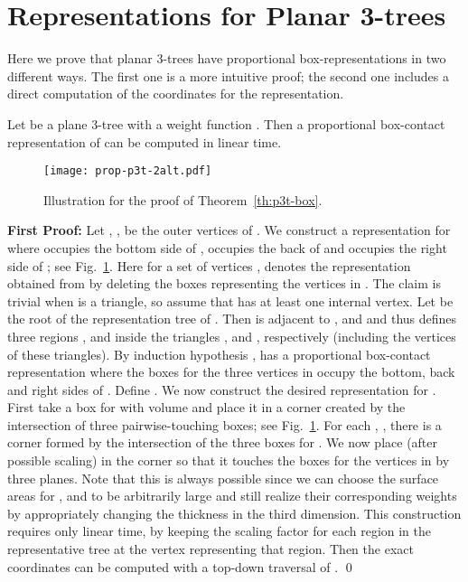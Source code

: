 \documentclass{llncs}
\begin{document}
 








\section{Representations for Planar 3-trees}


Here we prove that planar 3-trees have proportional box-representations in two different ways.
The first one is a more intuitive proof; the second one includes a direct computation of the coordinates
for the representation.


\begin{theorem}
\label{th:p3t-box} Let  be a plane 3-tree with a weight function . Then a
 proportional box-contact representation of  can be computed in linear time.
\end{theorem}




\begin{figure}[t]
\centering
\texttt{[image: prop-p3t-2alt.pdf]}
\caption{Illustration for the proof of Theorem~\ref{th:p3t-box}.}
\label{fig:prop-p3t-2}
\end{figure}



\noindent
\textbf{First Proof:}
Let , ,  be the outer vertices of . We construct a representation  for
  where  occupies the bottom side of ,  occupies the back of
  and  occupies the right side of ; see
 Fig.~\ref{fig:prop-p3t-2}. 
 Here for a set of vertices ,  denotes the representation obtained from  by deleting
 the boxes representing the vertices in . The claim is trivial when
  is a triangle, so assume that  has at least one internal vertex. Let 
 be the root of the representation tree  of . Then  is adjacent to ,  and 
 and thus defines three regions ,  and  inside the triangles ,
  and , respectively (including the vertices of these triangles).
 By induction hypothesis ,  has a proportional box-contact representation
  where the boxes for the three vertices in  occupy the bottom, back
 and right sides of . Define . We now construct
 the desired representation for . First take a box for  with volume  and place it in
 a corner created by the intersection of three pairwise-touching boxes; see
 Fig.~\ref{fig:prop-p3t-2}.  For each , , there is a corner  formed by the
 intersection of the three boxes for . We now place  (after possible
 scaling) in the corner  so that it touches the boxes for the vertices in  by
 three planes. Note that this is always possible since we can choose the surface areas for ,  and  to
 be arbitrarily large and still realize their corresponding weights
by appropriately changing the thickness in the third dimension.
This construction requires only linear time, by keeping the scaling factor for each
 region in the representative tree  at the vertex representing
 that region. 
Then the exact coordinates can be computed with a top-down traversal of . \qed
\end{document}
